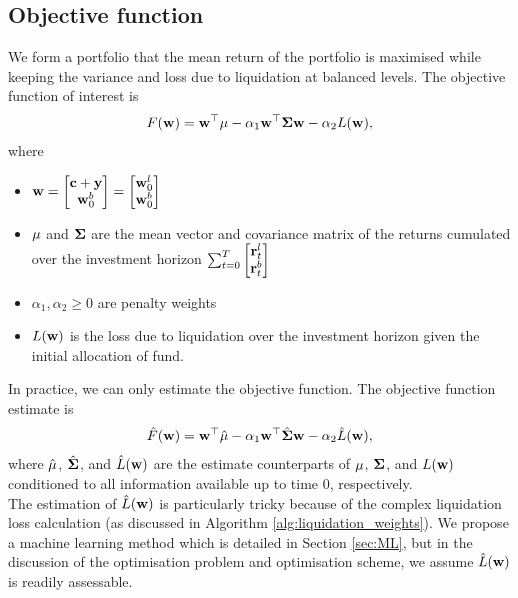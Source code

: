\documentclass{article} %
\theoremstyle{plain}
\theoremstyle{definition} %
\begin{document}
\subsection{Objective function}
We form a portfolio that the mean return of the portfolio is maximised while keeping the variance and loss due to liquidation at balanced levels.
 The objective function of interest is
 \begin{align}
  F({\bf w}) = {\bf w}^\top {\bf \mu} - \alpha_1 {\bf w}^\top {\bf \Sigma}{\bf w} - \alpha_2 L({\bf w}),
 \end{align}
 where 
 \begin{itemize}
 \item ${\bf w} = \begin{bmatrix} 
  {\bf c} + {\bf y} \\  {\bf w}^b_0 \end{bmatrix} = \begin{bmatrix} 
  {\bf w}^l_0 \\  {\bf w}^b_0 \end{bmatrix}$
  \item  ${\bf \mu}$ and ${\bf \Sigma}$ are the mean vector and covariance matrix of the returns cumulated over the investment horizon
  $\sum_{t=0}^T \begin{bmatrix}
    {\bf r}^l_t \\ {\bf r}^b_t
    \end{bmatrix}$
  \item $\alpha_1 , \alpha_2 \geq 0$ are penalty weights
  \item $L({\bf w})$ is the loss due to liquidation over the investment horizon given the initial allocation of fund. 
 \end{itemize}

In practice, we can only estimate the objective function. 
 The objective function estimate is 
 \begin{align}
  \hat F({\bf w}) = {\bf w}^\top \hat {\bf \mu} - \alpha_1 {\bf w}^\top \hat {\bf \Sigma}{\bf w} - \alpha_2 \hat L({\bf w}),
 \end{align}
 where $\hat {\bf \mu}$, $\hat {\bf \Sigma}$, and $\hat L({\bf w})$ are the estimate counterparts of ${\bf \mu}$, ${\bf \Sigma}$, and $L({\bf w})$ conditioned to all information available up to time $0$, respectively. \\

The estimation of $\hat L({\bf w})$ is particularly tricky because of the complex liquidation loss calculation (as discussed in Algorithm \ref{alg:liquidation_weights}). 
 We propose a machine learning method which is detailed in Section \ref{sec:ML}, 
 but in the discussion of the optimisation problem and optimisation scheme, 
 we assume $\hat L({\bf w})$ is readily assessable. \\
\end{document}
